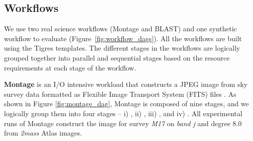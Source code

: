 
\vspace{-0.3cm}
\subsection{Workflows}
We use two real science workflows (Montage and BLAST) and one synthetic
workflow to evaluate \systemname (Figure~\ref{fig:workflow_dags}). All the workflows
are built using the Tigres templates. The different stages in the workflows
are logically grouped together into parallel and sequential stages based
on the resource requirements at each stage of the workflow. 

\noindent \textbf{Montage} \cite{jacob2009montage} is an I/O intensive
workload \cite{juve2013characterizing} that constructs a JPEG image from
sky survey data formatted as Flexible Image Transport System (FITS) files
\cite{pence2010definition}. As shown in Figure \ref{fig:montage_dag},
Montage is composed of nine stages, and we logically group them into
four stages -- i) \montageFirst, ii) \montageSecond, iii) \montageThird, and iv) \montageFourth.
All experimental runs of Montage construct the image for survey \textit{M17}
on \textit{band j} and degree 8.0 from \textit{2mass} Atlas images. 

